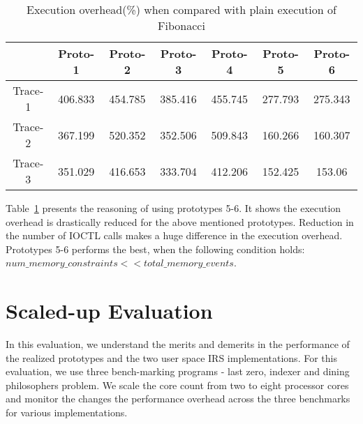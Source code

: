 \begin{table}[h]
\begin{center}
 \begin{tabular}{|c c c c c c c|} 
 \hline
 & Proto-1 & Proto-2 & Proto-3 & Proto-4 & Proto-5 & Proto-6\\ %
 \hline
 Trace-1 & 406.833 & 454.785 & 385.416 & 455.745 & 277.793 & 275.343 \\ 
 Trace-2 & 367.199 & 520.352 & 352.506 & 509.843 & 160.266 & 160.307 \\
 Trace-3 & 351.029 & 416.653 & 333.704 & 412.206 & 152.425 & 153.06\\
 \hline
\end{tabular}
\end{center}
\caption{Execution overhead(\%) when compared with plain execution of Fibonacci}
\label{fib_exec_over}
\end{table}

Table~\ref{fib_exec_over} presents the reasoning of using prototypes 5-6. 
It shows the execution overhead is drastically reduced for the above mentioned prototypes. 
Reduction in the number of IOCTL calls makes a huge difference in the execution overhead. 
Prototypes 5-6 performs the best, when the following condition holds:
$num\_memory\_constraints << total\_memory\_events$.
\section{Scaled-up Evaluation}

In this evaluation, we understand the merits and demerits in the performance of the realized prototypes and the two user space IRS implementations. 
For this evaluation, we use three bench-marking programs - last zero, indexer and dining philosophers problem. 
We scale the core count from two to eight processor cores and monitor the changes the performance overhead across the three benchmarks for various implementations. 
